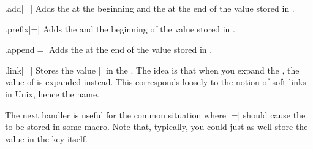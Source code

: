 
\begin{handler}{{.add}|=|}
    Adds the  at the beginning and the 
    at the end of the value stored in .
\end{handler}

\begin{handler}{{.prefix}|=|}
    Adds the  and the beginning of the value stored in
    .
\end{handler}

\begin{handler}{{.append}|=|}
    Adds the  at the end of the value stored in .
\end{handler}

\begin{handler}{{.link}|=|}
    Stores the value || in the .
    The idea is that when you expand the , the value of  is expanded instead. This corresponds loosely to the notion of soft
    links in Unix, hence the name.
\end{handler}

The next handler is useful for the common situation where
|=| should cause the  to be stored in some
macro. Note that, typically, you could just as well store the value in the key
itself.


